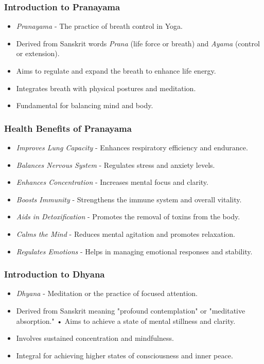 \begin{frame}[fragile]\frametitle{Introduction to Pranayama}

      \begin{itemize}
		\item \textit{Pranayama} - The practice of breath control in Yoga.
		\item Derived from Sanskrit words \textit{Prana} (life force or breath) and \textit{Ayama} (control or extension).
		\item Aims to regulate and expand the breath to enhance life energy.
		\item Integrates breath with physical postures and meditation.
		\item Fundamental for balancing mind and body.
	  \end{itemize}

\end{frame}

\begin{frame}[fragile]\frametitle{Health Benefits of Pranayama}

      \begin{itemize}
		\item \textit{Improves Lung Capacity} - Enhances respiratory efficiency and endurance.
		\item \textit{Balances Nervous System} - Regulates stress and anxiety levels.
		\item \textit{Enhances Concentration} - Increases mental focus and clarity.
		\item \textit{Boosts Immunity} - Strengthens the immune system and overall vitality.
		\item \textit{Aids in Detoxification} - Promotes the removal of toxins from the body.
		\item \textit{Calms the Mind} - Reduces mental agitation and promotes relaxation.
		\item \textit{Regulates Emotions} - Helps in managing emotional responses and stability.
	  \end{itemize}

\end{frame}

\begin{frame}[fragile]\frametitle{Introduction to Dhyana}

      \begin{itemize}
		\item \textit{Dhyana} - Meditation or the practice of focused attention.
		\item Derived from Sanskrit meaning "profound contemplation" or "meditative absorption."
		• Aims to achieve a state of mental stillness and clarity.
		\item Involves sustained concentration and mindfulness.
		\item Integral for achieving higher states of consciousness and inner peace.
	  \end{itemize}

\end{frame}

